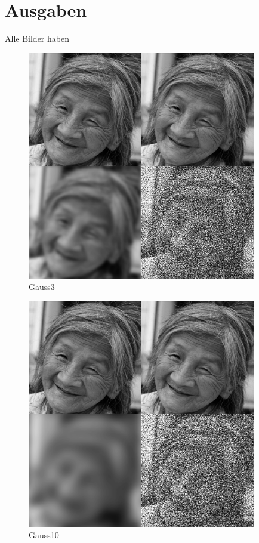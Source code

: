 \section*{Ausgaben}
Alle Bilder haben 
\begin{figure}[H]
\begin{center}
\includegraphics[width=100mm]{u03/gauss_3.eps}
\end{center}
\caption{Gauss3}
\end{figure}

\begin{figure}[H]
\begin{center}
\includegraphics[width=100mm]{u03/gauss_10.eps}
\end{center}
\caption{Gauss10}
\end{figure}

